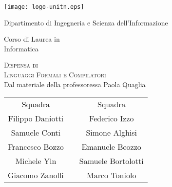 \documentclass[class=book, crop=false, oneside]{standalone}
\begin{document}
\begin{titlepage}
	\centering
	\texttt{[image: logo-unitn.eps]}

	\vspace{1.3cm}
	\LARGE{Dipartimento di Ingegneria e Scienza dell'Informazione\\}

	\vspace{.9cm}
	\Large{Corso di Laurea in\\ Informatica}

	\vspace{.9cm}
	\Huge\textsc{Dispensa di\\Linguaggi Formali e Compilatori\\}
	\vspace{.2cm}
	\large{Dal materiale della professoressa Paola Quaglia}

	\vspace{1.8cm}
	\begin{tabularx}{\textwidth}{cXc}
		\Large{Squadra} & & \Large{Squadra} \\
		\cmidrule(lr){1-1} \cmidrule(lr){3-3}
		\large{Filippo Daniotti} & & \large{Federico Izzo} \\
		\large{Samuele Conti} & & \large{Simone Alghisi} \\
		\large{Francesco Bozzo} & & \large{Emanuele Beozzo} \\
		\large{Michele Yin} & & \large{Samuele Bortolotti} \\
		\large{Giacomo Zanolli} & & \large{Marco Toniolo} \\
	\end{tabularx}

\end{titlepage}
\end{document}
